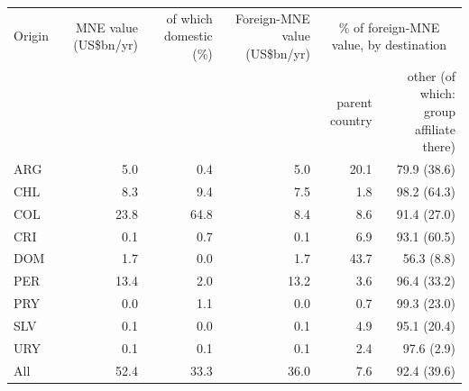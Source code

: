 \begin{tabular}{lrrrrr}
\toprule
Origin & MNE value (US\$bn/yr) & of which domestic (\%) & Foreign-MNE value (US\$bn/yr) & \multicolumn{2}{c}{\% of foreign-MNE value, by destination} \\
 & & & & parent country & other (of which: group affiliate there) \\
\midrule
ARG & 5.0 & 0.4 & 5.0 & 20.1 & 79.9 (38.6) \\
CHL & 8.3 & 9.4 & 7.5 & 1.8 & 98.2 (64.3) \\
COL & 23.8 & 64.8 & 8.4 & 8.6 & 91.4 (27.0) \\
CRI & 0.1 & 0.7 & 0.1 & 6.9 & 93.1 (60.5) \\
DOM & 1.7 & 0.0 & 1.7 & 43.7 & 56.3 (8.8) \\
PER & 13.4 & 2.0 & 13.2 & 3.6 & 96.4 (33.2) \\
PRY & 0.0 & 1.1 & 0.0 & 0.7 & 99.3 (23.0) \\
SLV & 0.1 & 0.0 & 0.1 & 4.9 & 95.1 (20.4) \\
URY & 0.1 & 0.1 & 0.1 & 2.4 & 97.6 (2.9) \\
\midrule
All & 52.4 & 33.3 & 36.0 & 7.6 & 92.4 (39.6) \\
\bottomrule
\end{tabular}
